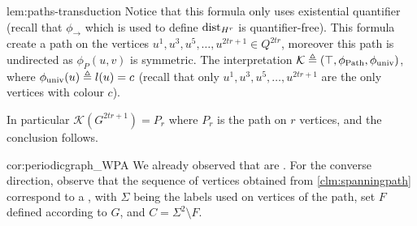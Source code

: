 \begin{proofof}{lem:paths-transduction}
Notice that this formula
only uses existential quantifier (recall that $\phi_{\rightarrow}$ which is
used to define $\operatorname{dist}_{H^r}$ is quantifier-free). This formula create a path on
the vertices $u^1,u^3,u^5, \dots, u^{2tr+1} \in Q^{2tr} $, moreover this path
is undirected as $\phi_P(u,v)$ is symmetric. The interpretation $\mathcal{K}
\triangleq (\top, \phi_{\operatorname{Path}}, \phi_{\text{univ}})$, where
$\phi_{\text{univ}}(u) \triangleq l(u) = c$ (recall that only $u^1,u^3,u^5, \dots,
u^{2tr+1}$ are the only vertices with colour $c$).

In particular $\mathcal{K}(G^{2tr +1}) = P_r$ where $P_r$ is the path on $r$
vertices, and the conclusion follows.  
\end{proofof}

\begin{proofof}{cor:periodicgraph_WPA}
  We already observed that 
  are .
  For the converse direction,
  observe that the sequence of vertices obtained from 
  \cref{clm:spanningpath} correspond  to a , with $\Sigma$
  being the labels used on vertices of the path, set $F$ defined according to $G$, and $C = \Sigma^2 \setminus F$.
\end{proofof}

